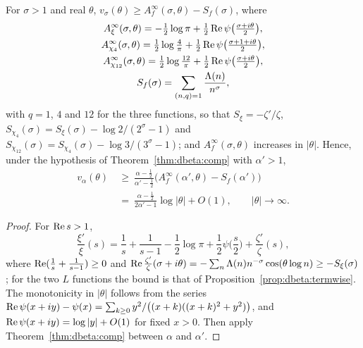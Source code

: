 \begin{corollary}\label{cor:dbeta:lower}
For $\sigma>1$ and real $\theta$, $v_\sigma(\theta)\ge A^\infty_f(\sigma,\theta)-S_f(\sigma)$, where
\begin{gather*}
A^\infty_\xi(\sigma,\theta)=-\tfrac12\log\pi+\tfrac12\operatorname{Re}\psi\big(\tfrac{\sigma+i\theta}2\big),\\
A^\infty_{\chi_4}(\sigma,\theta)=\tfrac12\log\tfrac4\pi+\tfrac12\operatorname{Re}\psi\big(\tfrac{\sigma+1+i\theta}2\big),\\
A^\infty_{\chi_{12}}(\sigma,\theta)=\tfrac12\log\tfrac{12}\pi+\tfrac12\operatorname{Re}\psi\big(\tfrac{\sigma+i\theta}2\big),\\
S_f(\sigma)=\sum_{(n,q)=1}\frac{\Lambda(n)}{n^\sigma},
\end{gather*}
with $q=1$, $4$ and $12$ for the three functions, so that $S_\xi=-\zeta'/\zeta$, $S_{\chi_4}(\sigma)=S_\xi(\sigma)-\log2/(2^\sigma-1)$ and $S_{\chi_{12}}(\sigma)=S_{\chi_4}(\sigma)-\log3/(3^\sigma-1)$; and $A^\infty_f(\sigma,\theta)$ increases in $|\theta|$. Hence, under the hypothesis of Theorem~\ref{thm:dbeta:comp} with $\alpha'>1$,
\begin{align*}
v_\alpha(\theta)&\ \ge\ \frac{\alpha-\frac12}{\alpha'-\frac12}\Big(A^\infty_f(\alpha',\theta)-S_f(\alpha')\Big)\\
&\ =\ \frac{\alpha-\frac12}{2\alpha'-1}\log|\theta|+O(1),\qquad|\theta|\to\infty .
\end{align*}
\end{corollary}

\begin{proof}
For $\operatorname{Re} s>1$,
\[
\frac{\xi'}\xi(s)=\frac1s+\frac1{s-1}-\frac12\log\pi+\frac12\psi\Big(\frac s2\Big)+\frac{\zeta'}\zeta(s),
\]
where $\operatorname{Re}(\frac1s+\frac1{s-1})\ge0$ and $\operatorname{Re}\frac{\zeta'}\zeta(\sigma+i\theta)=-\sum_n\Lambda(n)n^{-\sigma}\cos(\theta\log n)\ge-S_\xi(\sigma)$; for the two $L$ functions the bound is that of Proposition~\ref{prop:dbeta:termwise}. The monotonicity in $|\theta|$ follows from the series $\operatorname{Re}\psi(x+iy)-\psi(x)=\sum_{k\ge0}y^2/\big((x+k)((x+k)^2+y^2)\big)$, and $\operatorname{Re}\psi(x+iy)=\log|y|+O(1)$ for fixed $x>0$. Then apply Theorem~\ref{thm:dbeta:comp} between $\alpha$ and $\alpha'$.
\end{proof}


